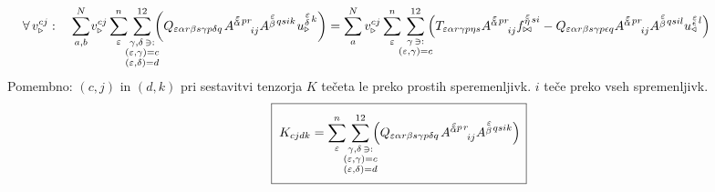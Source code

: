 \begin{equation}
   \hspace{-18mm}
   \forall \, v^{c j}_{\triangleright}: \quad
   \sum^N_{a,b} \mkern-2mu v^{c  j}_{\triangleright}
   \sum^n_\varepsilon
   \mkern-7mu
   \sum_{\substack{\gamma, \delta \, \ni: \\
      (\varepsilon,\gamma) = c \\ (\varepsilon,\delta) = d}}^{12}
   \mkern-10mu
   \qty(
   Q_{\varepsilon   \alpha r   \beta s   \gamma p   \delta q} \mkern2mu
   A^{\substack{\mkern2mu \varepsilon \\[-0.65mm] \alpha} \mkern2mu p r}_{\mkern29mu i j}
   A^{\substack{\mkern2mu \varepsilon \\[0.05mm] \beta} \mkern2mu q s i k} \mkern1mu
   u^{\substack{\mkern2mu \varepsilon \\[0.09mm] \delta} \mkern2mu k}_\triangleright )
   =
   \sum^N_a v^{c j}_{\triangleright}
   \sum^n_\varepsilon
   \mkern-7mu
   \sum_{\substack{\gamma \, \ni: \\ (\varepsilon,\gamma) = c}}^{12}
   \mkern-10mu
   \qty(
   T_{\varepsilon   \alpha r   \gamma p   \eta s}
   A^{\substack{\mkern2mu \varepsilon \\[-0.65mm] \alpha} \mkern2mu p r}_{\mkern29mu i j}
   f^{\substack{\mkern2mu \varepsilon \\[-0.59mm] \eta} \mkern2mu s i}_{\bowtie}
   -
   Q_{\varepsilon   \alpha r   \beta s   \gamma p   \epsilon q}
   A^{\substack{\mkern2mu \varepsilon \\[-0.65mm] \alpha} \mkern2mu p r}_{\mkern29mu i j}
   A^{\substack{\mkern2mu \varepsilon \\[0.05mm] \beta} \mkern2mu q s i l}
   u^{\substack{\mkern2mu \varepsilon \\[-0.55mm] \epsilon} \mkern2mu l}_\triangleleft )
\end{equation}
Pomembno: $(c, j)$ in $(d, k)$ pri sestavitvi tenzorja $K$ tečeta le preko prostih speremenljivk. $i$ teče preko vseh spremenljivk.
\begin{equation}
   \boxed{ \phantom{\rule[-12mm]{1mm}{20mm}}
   K_{cjdk} =
   \sum^n_\varepsilon
   \mkern-7mu
   \sum_{\substack{\gamma, \delta \, \ni: \\
      (\varepsilon,\gamma) = c \\ (\varepsilon,\delta) = d}}^{12}
   \mkern-10mu
   \qty(
   Q_{\varepsilon   \alpha r   \beta s   \gamma p   \delta q} \mkern2mu
   A^{\substack{\mkern2mu \varepsilon \\[-0.65mm] \alpha} p \mkern2mu r}_{\mkern29mu i j}
   A^{\substack{\mkern2mu \varepsilon \\[0.05mm] \beta} \mkern2mu  q s i k} ) \mkern3mu }
\end{equation}
